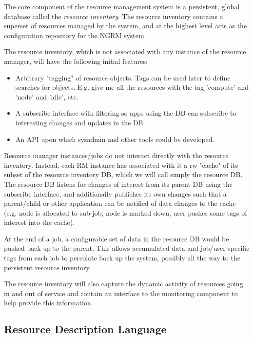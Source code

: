 The core component of the resource management system is
a persistent, global database called the {\em resource inventory}.
The resource inventory contains a superset of resources managed
by the system, and at the highest level acts as the configuration
repository for the NGRM system.

The resource inventory, which is not associated with any instance
of the resource manager, will have the following initial features:

\begin{itemize}
\item{Arbitrary "tagging" of resource objects. Tags can be used later
   to define searches for objects. E.g. give me all the resources
   with the tag 'compute' and 'node' and 'idle', etc.}

\item{A subscribe interface with filtering so apps using the DB can
   subscribe to interesting changes and updates in the DB.}

\item{An API upon which sysadmin and other tools could be developed.}
\end{itemize}

Resource manager instances/jobs do not interact directly with
the resource inventory.  Instead, each RM instance has associated
with it a rw "cache" of its subset of the resource inventory DB,
which we will call simply the resource DB.  The resource DB
listens for changes of interest from its parent DB using
the subscribe interface, and additionally publishes its own
changes such that a parent/child or other application can
be notified of data changes to the cache (e.g. node is allocated
to sub-job, node is marked down, user pushes some tags of
interest into the cache).

At the end of a job, a configurable set of data in the
resource DB would be pushed back up to the parent. This
allows accumulated data and job/user specific tags from
each job to percolate back up the system, possibly all
the way to the persistent resource inventory.

The resource inventory will also capture the dynamic activity of
resources going in and out of service and contain an interface to the
monitoring component to help provide this information.

\subsection{Resource Description Language}

